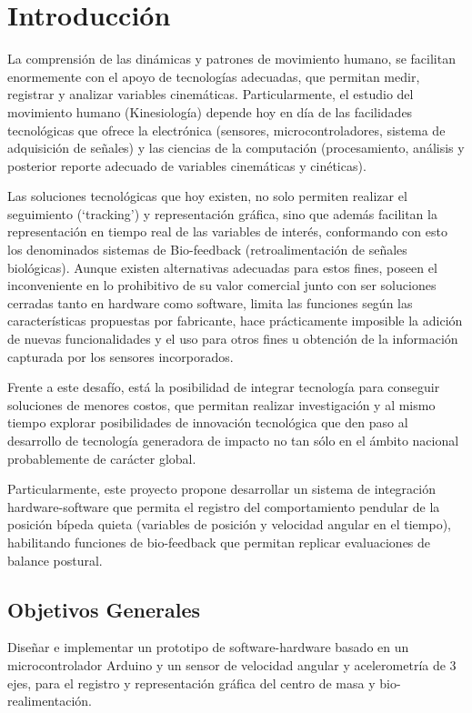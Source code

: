 \documentclass[12pt,a4paper]{article}
\let\stdsection\section
\renewcommand\section{\newpage\stdsection}
\begin{document}
\tableofcontents %
\thispagestyle{empty}
\pagebreak



\section{Introducción}
La comprensión de las dinámicas y patrones de movimiento humano, se facilitan enormemente con el apoyo de tecnologías adecuadas, que permitan medir, registrar y analizar variables cinemáticas. Particularmente, el estudio del movimiento humano (Kinesiología) depende hoy en día de las facilidades tecnológicas que ofrece la electrónica (sensores, microcontroladores, sistema de adquisición de señales) y las ciencias de la computación (procesamiento, análisis y posterior reporte adecuado de  variables cinemáticas y cinéticas).  

Las soluciones tecnológicas que hoy existen, no solo permiten realizar el seguimiento (‘tracking’) y representación gráfica, sino que además facilitan la representación en tiempo real de las variables de interés, conformando con esto los denominados sistemas de Bio-feedback (retroalimentación de señales biológicas). Aunque existen alternativas adecuadas para estos fines, poseen el inconveniente en lo prohibitivo de su valor comercial junto con ser soluciones cerradas tanto en hardware como software, limita las funciones según las características propuestas por fabricante, hace prácticamente imposible la adición de nuevas funcionalidades y el uso para otros fines u obtención de la información capturada por los sensores incorporados.

Frente a este desafío, está la posibilidad de integrar tecnología para conseguir soluciones de menores costos, que permitan realizar investigación y al mismo tiempo explorar posibilidades de innovación tecnológica que den paso al desarrollo de tecnología generadora de impacto no tan sólo en el ámbito nacional probablemente de carácter global.

Particularmente, este proyecto propone desarrollar un sistema de integración hardware-software que permita el registro del comportamiento pendular de la posición bípeda quieta (variables de posición y velocidad angular en el tiempo), habilitando funciones de bio-feedback que permitan replicar evaluaciones de balance postural.

\subsection{Objetivos Generales}
Diseñar e implementar un prototipo de software-hardware basado en un microcontrolador Arduino y un sensor de velocidad angular y acelerometría de 3 ejes, para el registro y representación gráfica del centro de masa y bio-realimentación.
\end{document}
